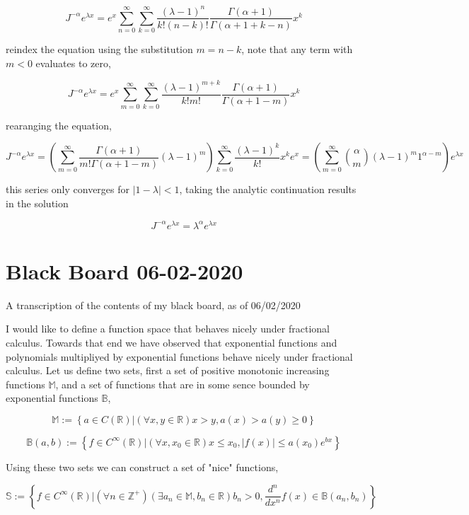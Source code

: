 \documentclass[%
 preprint,
 amsmath, amssymb, aps, pra, 10pt
]{revtex4-2}
\begin{document}
\[J^{-\alpha} e^{\lambda x} = e^x \sum_{n=0}^\infty \sum_{k=0}^\infty \frac{(\lambda - 1)^n}{k!(n - k)!}\frac{\Gamma(\alpha + 1)}{\Gamma(\alpha + 1 + k - n)}x^k \]

reindex the equation using the substitution $m = n - k$, note that any term with $m < 0$ evaluates to zero,

\[J^{-\alpha} e^{\lambda x} = e^x \sum_{m=0}^\infty \sum_{k=0}^\infty \frac{(\lambda - 1)^{m + k}}{k!m!}\frac{\Gamma(\alpha + 1)}{\Gamma(\alpha + 1 - m)}x^k \]

rearanging the equation,

\[J^{-\alpha} e^{\lambda x} = \left(\sum_{m=0}^\infty \frac{\Gamma(\alpha + 1)}{m!\Gamma(\alpha + 1 - m)}(\lambda - 1)^m\right) \sum_{k=0}^\infty \frac{(\lambda - 1)^k}{k!}x^k e^x = \left(\sum_{m=0}^\infty \binom{\alpha}{m}(\lambda - 1)^m 1^{\alpha - m}\right) e^{\lambda x}\]

this series only converges for $\left|1 - \lambda\right| < 1$, taking the analytic continuation results in the solution

 \[J^{-\alpha} e^{\lambda x} = \lambda^\alpha e^{\lambda x}\]
 
 
\section{Black Board 06-02-2020}

A transcription of the contents of my black board, as of 06/02/2020

I would like to define a function space that behaves nicely under fractional calculus. Towards that end we have observed that exponential functions and polynomials multipliyed by exponential functions behave nicely under fractional calculus. Let us define two sets, first a set of positive monotonic increasing functions $\mathbb{M}$, and a set of functions that are in some sence bounded by exponential functions $\mathbb{B}$,

\[\mathbb{M} := \left\lbrace a \in C(\mathbb{R}) | (\forall x, y \in \mathbb{R}) x > y, a(x) > a(y) \geq 0 \right\rbrace\]

\[\mathbb{B}(a, b) := \left\lbrace f \in C^\infty(\mathbb{R}) | (\forall x, x_0 \in \mathbb{R}) x \leq x_0, |f(x)| \leq a(x_0)e^{bx} \right\rbrace\]

Using these two sets we can construct a set of "nice" functions,

\begin{equation}
\mathbb{S} := \left\lbrace f \in C^\infty(\mathbb{R}) | (\forall n \in \mathbb{Z}^+)(\exists a_n \in \mathbb{M}, b_n \in \mathbb{R}) b_n > 0, \frac{d^n}{dx^n}f(x) \in \mathbb{B}(a_n, b_n) \right\rbrace
\label{exponentialy_bounded}
\end{equation}
\end{document}
